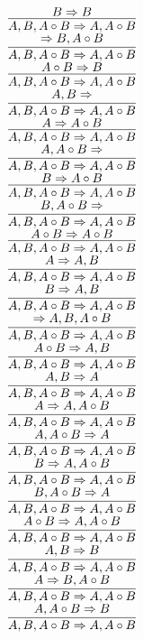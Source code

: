 \documentclass[11pt]{article}
\begin{document}
\begin{center}
\bigskip
\\$\infer{A, B, A\circ B\Rightarrow A, A\circ B}{B\Rightarrow B}$
\bigskip
\\$\infer{A, B, A\circ B\Rightarrow A, A\circ B}{\Rightarrow B, A\circ B}$
\bigskip
\\$\infer{A, B, A\circ B\Rightarrow A, A\circ B}{A\circ B\Rightarrow B}$
\bigskip
\\$\infer{A, B, A\circ B\Rightarrow A, A\circ B}{A, B\Rightarrow }$
\bigskip
\\$\infer{A, B, A\circ B\Rightarrow A, A\circ B}{A\Rightarrow A\circ B}$
\bigskip
\\$\infer{A, B, A\circ B\Rightarrow A, A\circ B}{A, A\circ B\Rightarrow }$
\bigskip
\\$\infer{A, B, A\circ B\Rightarrow A, A\circ B}{B\Rightarrow A\circ B}$
\bigskip
\\$\infer{A, B, A\circ B\Rightarrow A, A\circ B}{B, A\circ B\Rightarrow }$
\bigskip
\\$\infer{A, B, A\circ B\Rightarrow A, A\circ B}{A\circ B\Rightarrow A\circ B}$
\bigskip
\\$\infer{A, B, A\circ B\Rightarrow A, A\circ B}{A\Rightarrow A, B}$
\bigskip
\\$\infer{A, B, A\circ B\Rightarrow A, A\circ B}{B\Rightarrow A, B}$
\bigskip
\\$\infer{A, B, A\circ B\Rightarrow A, A\circ B}{\Rightarrow A, B, A\circ B}$
\bigskip
\\$\infer{A, B, A\circ B\Rightarrow A, A\circ B}{A\circ B\Rightarrow A, B}$
\bigskip
\\$\infer{A, B, A\circ B\Rightarrow A, A\circ B}{A, B\Rightarrow A}$
\bigskip
\\$\infer{A, B, A\circ B\Rightarrow A, A\circ B}{A\Rightarrow A, A\circ B}$
\bigskip
\\$\infer{A, B, A\circ B\Rightarrow A, A\circ B}{A, A\circ B\Rightarrow A}$
\bigskip
\\$\infer{A, B, A\circ B\Rightarrow A, A\circ B}{B\Rightarrow A, A\circ B}$
\bigskip
\\$\infer{A, B, A\circ B\Rightarrow A, A\circ B}{B, A\circ B\Rightarrow A}$
\bigskip
\\$\infer{A, B, A\circ B\Rightarrow A, A\circ B}{A\circ B\Rightarrow A, A\circ B}$
\bigskip
\\$\infer{A, B, A\circ B\Rightarrow A, A\circ B}{A, B\Rightarrow B}$
\bigskip
\\$\infer{A, B, A\circ B\Rightarrow A, A\circ B}{A\Rightarrow B, A\circ B}$
\bigskip
\\$\infer{A, B, A\circ B\Rightarrow A, A\circ B}{A, A\circ B\Rightarrow B}$

\end{center}
\end{document}
